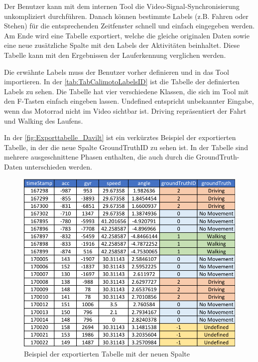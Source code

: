 Der Benutzer kann mit dem internen Tool die Video-Signal-Synchronisierung unkompliziert durchführen. Danach können bestimmte Labels (z.B. Fahren oder Stehen) für die entsprechenden Zeitfenster schnell und einfach eingegeben werden. Am Ende wird eine Tabelle exportiert, welche die gleiche originalen Daten sowie eine neue zusätzliche Spalte mit den Labels der Aktivitäten beinhaltet.
Diese Tabelle kann mit den Ergebnissen der Lauferkennung verglichen werden.

Die erwähnte Labels muss der Benutzer vorher definieren und in das Tool importieren. In der \autoref{tab:TabCalimotoLabelsID} ist die Tabelle der definierten Labels zu sehen. Die Tabelle hat vier verschiedene Klassen, die sich im Tool mit den F-Tasten einfach eingeben lassen. \glqq Undefined\grqq{} entspricht unbekannter Eingabe, wenn das Motorrad nicht im Video sichtbar ist. \glqq Driving\grqq{} repräsentiert der Fahrt und \glqq Walking\grqq{} des Laufens.
 
In der \autoref{fig:Exporttabelle_Davilt} ist ein verkürztes Beispiel der exportierten Tabelle, in der die neue Spalte \glqq GroundTruthID\grqq{} zu sehen ist. In der Tabelle sind mehrere ausgeschnittene Phasen enthalten, die auch durch die GroundTruth-Daten unterschieden werden.
\begin{figure}
	\centering
	\includegraphics[width=\linewidth]{Bilder/GriundTruthTabelle.pdf}
	\caption{Beispiel der exportierten Tabelle mit der neuen Spalte}
	\label{fig:Exporttabelle_Davilt}
\end{figure}


